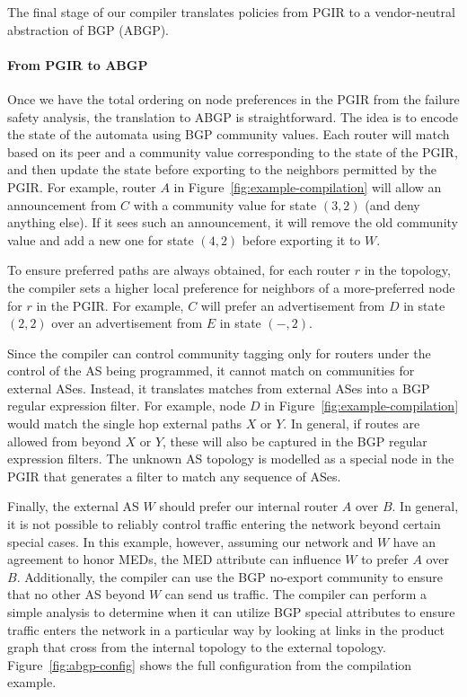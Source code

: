 \documentclass[10pt]{sigalternate052015}
\newcommand{\para}[1]{\paragraph*{\textbf{#1}}}
\begin{document}
The final stage of our compiler translates policies from PGIR to a vendor-neutral abstraction of BGP (ABGP).


\para{From PGIR to ABGP}

Once we have the total ordering on node preferences in the PGIR from the failure safety analysis, the translation to ABGP is straightforward. The idea is to encode the state of the automata using BGP community values. Each router will match based on its peer and a community value corresponding to the state of the PGIR, and then update the state before exporting to the neighbors permitted by the PGIR. For example, router $A$ in Figure~\ref{fig:example-compilation} will allow an announcement from $C$ with a community value for state $(3,2)$ (and deny anything else). If it sees such an announcement, it will remove the old community value and add a new one for state $(4,2)$ before exporting it to $W$.

To ensure preferred paths are always obtained, for each router $r$ in the topology, the compiler sets a higher local preference for neighbors of a more-preferred node for $r$ in the PGIR. For example, $C$ will prefer an advertisement from $D$ in state $(2,2)$ over an advertisement from $E$ in state $(-,2)$.

Since the compiler can control community tagging only for routers under the control of the AS being programmed, it cannot match on communities for external ASes. Instead, it translates matches from external ASes into a BGP regular expression filter. For example, node $D$ in Figure~\ref{fig:example-compilation} would match the single hop external paths $X$ or $Y$. In general, if routes are allowed from beyond $X$ or $Y$, these will also be captured in the BGP regular expression filters. The unknown AS topology is modelled as a special node in the PGIR that generates a filter to match any sequence of ASes.


Finally, the external AS $W$ should prefer our internal router $A$ over $B$. In general, it is not possible to reliably control traffic entering the network beyond certain special cases. In this example, however, assuming our network and $W$ have an agreement to honor MEDs, the MED attribute can influence $W$ to prefer $A$ over $B$. Additionally, the compiler can use the BGP no-export community to ensure that no other AS beyond $W$ can send us traffic. The compiler can perform a simple analysis to determine when it can utilize BGP special attributes to ensure traffic enters the network in a particular way by looking at links in the product graph that cross from the internal topology to the external topology.
Figure~\ref{fig:abgp-config} shows the full configuration from the compilation example.
\end{document}
